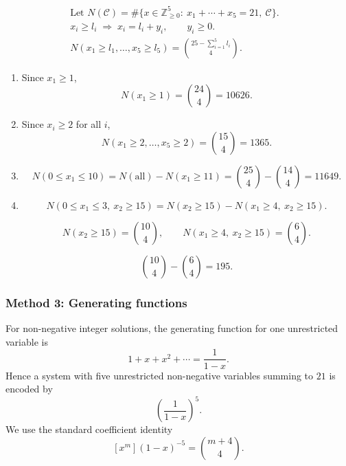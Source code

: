 \documentclass[12pt]{article}
\begin{document}
\[
\begin{aligned}
&\text{Let } N(\mathcal C)
= \#\{x\in\mathbb Z_{\ge0}^5:\ x_1+\cdots+x_5=21,\ \mathcal C\}.
&&\\[6pt]
&x_i \ge l_i
\;\Rightarrow\;
x_i = l_i + y_i,\qquad y_i \ge 0.
&&\\[6pt]
&N(x_1\ge l_1,\dots,x_5\ge l_5)
= \binom{25-\sum_{i=1}^5 l_i}{4}.&&
\end{aligned}
\]

\begin{enumerate}[label=(\alph*)]
\item Since \(x_1\ge1\),
\[
N(x_1\ge1)=\binom{24}{4}=10626.
\]

\item Since \(x_i\ge2\) for all \(i\),
\[
N(x_1\ge2,\dots,x_5\ge2)=\binom{15}{4}=1365.
\]

\item
\[
N(0\le x_1\le10)=N(\text{all})-N(x_1\ge11)
=\binom{25}{4}-\binom{14}{4}=11649.
\]

\item
\[
N(0\le x_1\le3,\ x_2\ge15)
= N(x_2\ge15)-N(x_1\ge4,\ x_2\ge15).
\]

\[
N(x_2\ge15)=\binom{10}{4},\qquad
N(x_1\ge4,\ x_2\ge15)=\binom{6}{4}.
\]

\[
\binom{10}{4}-\binom{6}{4}=195.
\]
\end{enumerate}

\newpage
\subsubsection{Method 3: Generating functions}
For non-negative integer solutions, the generating function for one unrestricted variable is
\[
1+x+x^2+\cdots = \frac{1}{1-x}.
\]
Hence a system with five unrestricted non-negative variables summing to $21$ is encoded by
\[
\left(\frac{1}{1-x}\right)^5.
\]
We use the standard coefficient identity
\[
[x^m](1-x)^{-5}=\binom{m+4}{4}.
\]
\end{document}
